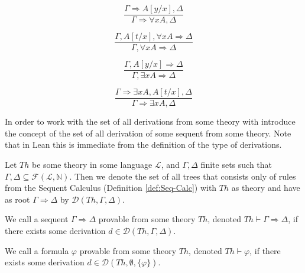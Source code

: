 \begin{definition}
\begin{multicols}{2}
\[
\frac{\Gamma \Rightarrow A[y/x], \Delta}{\Gamma \Rightarrow \forall x A, \Delta}\tag{$R\forall$}
\]

\[
\frac{\Gamma, A[t/x], \forall x A \Rightarrow \Delta}{\Gamma, \forall x A \Rightarrow \Delta}\tag{$L\forall$}
\]

\[
\frac{\Gamma, A[y/x] \Rightarrow \Delta}{\Gamma, \exists x A \Rightarrow \Delta}\tag{$L\exists$}
\]

\[
\frac{\Gamma \Rightarrow \exists x A, A[t/x], \Delta}{\Gamma \Rightarrow \exists x A, \Delta}\tag{$R\exists$}
\]

\end{multicols}

\end{definition}

In order to work with the set of all derivations from some theory with introduce the concept of the set of all derivation of some sequent from some theory. Note that in Lean this is immediate from the definition of the type of derivations.

\begin{definition}\label{def:Derivation}
\leanok
{}
Let $Th$ be some theory in some language $\mathcal{L}$, and $\Gamma, \Delta$ finite sets such that $\Gamma, \Delta \subseteq \mathcal{F}(\mathcal{L},\mathbb{N})$. Then we denote the set of all trees that consists only of rules from the Sequent Calculus (Definition \ref{def:Seq-Calc}) with $Th$ as theory and have as root $\Gamma \Rightarrow \Delta$ by $\mathcal{D}(Th,\Gamma,\Delta)$.
\end{definition}

\begin{definition}\label{def:Sequent-Provable}
\leanok
{}
We call a sequent $\Gamma \Rightarrow \Delta$ provable from some theory $Th$, denoted $Th \vdash \Gamma \Rightarrow \Delta$, if there exists some derivation $d \in \mathcal{D}(Th,\Gamma,\Delta)$.
\end{definition}

\begin{definition}\label{def:Formula-Provable}
\leanok
{}
We call a formula $\varphi$ provable from some theory $Th$, denoted $Th \vdash \varphi$, if there exists some derivation $d \in \mathcal{D}(Th,\emptyset,\{\varphi\})$.
\end{definition}

